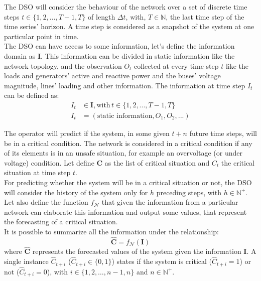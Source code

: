 The \gls{DSO} will consider the behaviour of the network over a set of discrete time steps $t \in \{1,2,...,T-1,T\}$ of length $\Delta t$, with, $T \in \mathbb{N}$, the last time step of the time series’ horizon. A time step is considered as a snapshot of the system at one particular point in time. \\ 

The \gls{DSO} can have access to some information, let's define the information domain as $\textbf{I}$. This information can be divided in static information like the network topology, and the observation $O_t$ collected at every time step $t$ like the loads and generators' active and reactive power and the buses' voltage magnitude, lines' loading and other information. The information at time step $I_t$ can be defined as:
\begin{align*}
    I_t & \in \textbf{I}, \text{with} \, t \in \{1,2,...,T-1,T\} \\
    I_t & = (\text{static information}, O_1, O_2, ...)
\end{align*}

The operator will predict if the system, in some given $t+n$ future time steps, will be in a critical condition. The network is considered in a critical condition if any of its elements is in an unsafe situation, for example an overvoltage (or under voltage) condition. Let define $\textbf{C}$ as the list of critical situation and $C_t$ the critical situation at time step $t$.  \\
For predicting whether the system will be in a critical situation or not, the \gls{DSO} will consider the history of the system only for $h$ preceding steps, with $h \in \mathbb{N}^+$. \\

Let also define the function $f_\mathcal{N}$ that given the information from a particular network can elaborate this information and output some values, that represent the forecasting of a critical situation. \\
It is possible to summarize all the information under the relationship:
\begin{equation} \label{eq:fmapping}
    \hat{\textbf{C}} = f_\mathcal{N}(\textbf{I})
\end{equation}
\noindent where $\hat{\textbf{C}}$ represents the forecasted values of the system given the information $\textbf{I}$. A single instance $\hat{C}_{t+i}$ ($\hat{C}_{t+i} \in \{0,1\}$) states if the system is critical ($\hat{C}_{t+i}=1$) or not ($\hat{C}_{t+i}=0$), with $i \in \{1,2,\dots,n-1,n\}$ and $n \in \mathbb{N}^+$. \\

